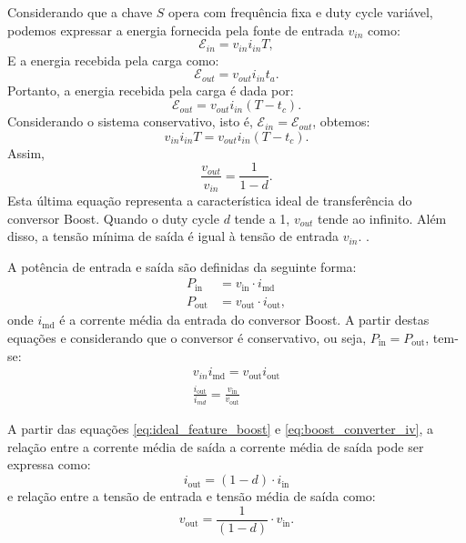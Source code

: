 Considerando que a chave $S$ opera com frequência fixa e duty cycle variável, podemos expressar a energia fornecida pela fonte de entrada $v_{in}$ como: \begin{equation} \mathcal{E}_{in} = v_{in} i_{in} T, \end{equation} E a energia recebida pela carga como: \begin{equation} \mathcal{E}_{out} = v_{out} i_{in} t_a. \end{equation} Portanto, a energia recebida pela carga é dada por: \begin{equation} \mathcal{E}_{out} = v_{out} i_{in} (T - t_c). \end{equation} Considerando o sistema conservativo, isto é, $\mathcal{E}_{in} = \mathcal{E}_{out}$, obtemos: \begin{equation} v_{in} i_{in} T = v_{out} i_{in} (T - t_c). \end{equation} Assim, \begin{equation} \frac{v_{out}}{v_{in}} = \frac{1}{1-d} \label{eq:ideal_feature_boost}.\end{equation} Esta última equação representa a característica ideal de transferência do conversor Boost. Quando o duty cycle $d$ tende a 1, $v_{out}$ tende ao infinito. Além disso, a tensão mínima de saída é igual à tensão de entrada $v_{in}$. \cite{martins2008}.

A potência de entrada e saída são definidas da seguinte forma: \begin{align} P_{\text{in}} &= v_{\text{in}} \cdot i_{\text{md}} \\ P_{\text{out}} &= v_{\text{out}} \cdot i_{\text{out}}, \end{align} onde $i_{\text{md}}$ é a corrente média da entrada do conversor Boost. A partir destas equações e considerando que o conversor é conservativo, ou seja, $P_{\text{in}} = P_{\text{out}}$, tem-se: \begin{gather} v_{in} i_{\text{md}} = v_{\text{out}}i_{\text{out}} \\ \frac{i_{\text{out}}}{i_{md}} = \frac{v_{\text{in}}}{v_{\text{out}}} \label{eq:boost_converter_iv} \end{gather}

A partir das equações \eqref{eq:ideal_feature_boost} e \eqref{eq:boost_converter_iv}, a relação entre a corrente média de saída a corrente média de saída pode ser expressa como: \begin{equation} i_{\text{out}} = (1 - d) \cdot i_{\text{in}} \label{eq:boost_converter_current_transfer} \end{equation} e relação entre a tensão de entrada e tensão média de saída como: \begin{equation} v_{\text{out}} = \frac{1}{(1 - d)} \cdot v_{\text{in}}. \label{eq:boost_converter_voltage_transfer}\end{equation}


